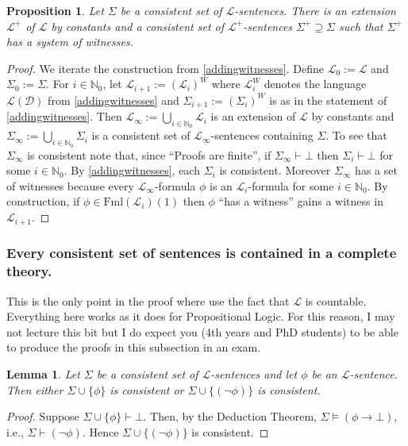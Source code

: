 \documentclass[11pt]{article}
\newcommand{\proves}{\vdash}
\newcommand{\Fml}{\textrm{Fml}}
\newtheorem{proposition}[theorem]{Proposition}
\newtheorem{lemma}[theorem]{Lemma}
\newcommand{\mcal}[1]{\mathcal{#1}}
\newcommand{\N}{\mathbb{N}}
\begin{document}
\begin{proposition}\label{extendwit}
Let $\Sigma$ be a consistent set of $\mcal{L}$-sentences. There is an extension $\mcal{L}^+$ of $\mcal{L}$ by constants and a consistent set of $\mcal{L}^+$-sentences $\Sigma^+\supseteq \Sigma$ such that $\Sigma^+$ has a system of witnesses.
\end{proposition}
\begin{proof}
We iterate the construction from \ref{addingwitnesses}. Define $\mcal{L}_0:=\mcal{L}$ and $\Sigma_0:=\Sigma$. For $i\in\N_0$, let $\mcal{L}_{i+1}:=(\mcal{L}_i)^W$ where $\mcal{L}_i^{W}$ denotes the language $\mcal{L}(\mcal{D})$ from \ref{addingwitnesses} and $\Sigma_{i+1}:=(\Sigma_i)^W$ is as in the statement of \ref{addingwitnesses}. Then $\mcal{L}_\infty:=\bigcup_{i\in\N_0}\mcal{L}_i$ is an extension of $\mcal{L}$ by constants and $\Sigma_\infty:=\bigcup_{i\in\N_0}\Sigma_i$ is a consistent set of $\mcal{L}_\infty$-sentences containing $\Sigma$. To see that $\Sigma_\infty$ is consistent note that, since ``Proofs are finite'', if $\Sigma_\infty\proves \bot$ then $\Sigma_i\proves \bot$ for some $i\in\N_0$. By \ref{addingwitnesses}, each $\Sigma_i$ is consistent. Moreover $\Sigma_\infty$ has a set of witnesses because every $\mcal{L}_\infty$-formula $\phi$ is an $\mcal{L}_i$-formula for some $i\in\N_0$. By construction, if $\phi\in\Fml(\mcal{L}_i)(1)$ then $\phi$ ``has a witness'' gains a witness in $\mcal{L}_{i+1}.$
\end{proof}


\subsubsection*{Every consistent set of sentences is contained in a complete theory.}
This is the only point in the proof where use the fact that $\mcal{L}$ is countable. Everything here works as it does for Propositional Logic. For this reason, I may not lecture this bit but I do expect you (4th years and PhD students) to be able to produce the proofs in this subsection in an exam.


\begin{lemma}\label{conext}
Let $\Sigma$ be a consistent set of $\mcal{L}$-sentences and let $\phi$ be an $\mcal{L}$-sentence. Then either $\Sigma\cup \{\phi\}$ is consistent or $\Sigma\cup\{(\neg\phi)\}$ is consistent.
\end{lemma}
\begin{proof}
Suppose $\Sigma\cup \{\phi\}\proves \bot$. Then, by the Deduction Theorem, $\Sigma\models (\phi\rightarrow \bot)$, i.e., $\Sigma \proves (\neg\phi)$. Hence $\Sigma \cup \{(\neg \phi)\}$ is consistent.
\end{proof}
\end{document}
